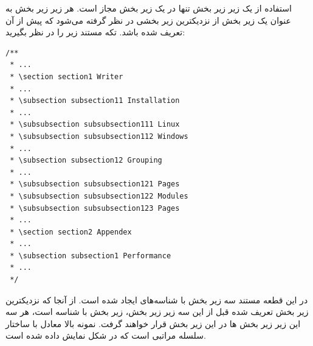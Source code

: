 استفاده از یک زیر زیر بخش تنها در یک زیر بخش مجاز است. هر زیر زیر بخش به عنوان
یک زیر بخش از نزدیکترین زیر بخشی در نظر گرفته می‌شود که پیش از آن تعریف شده
باشد. تکه مستند زیر را در نظر بگیرید:

\begin{latin}
\lstset{language=C++}  
\begin{lstlisting}[frame=single] 
/**
 * ...
 * \section section1 Writer
 * ...
 * \subsection subsection11 Installation
 * ...
 * \subsubsection subsubsection111 Linux
 * \subsubsection subsubsection112 Windows
 * ...
 * \subsection subsection12 Grouping
 * ...
 * \subsubsection subsubsection121 Pages
 * \subsubsection subsubsection122 Modules
 * \subsubsection subsubsection123 Pages
 * ...
 * \section section2 Appendex
 * ...
 * \subsection subsection1 Performance
 * ...
 */
\end{lstlisting}
\end{latin}

در این قطعه مستند سه زیر بخش با شناسه‌های  ایجاد شده است.
از آنجا که نزدیکترین زیر بخش تعریف شده قبل از این سه زیر زیر بخش، زیر بخش با
شناسه  است، هر سه این زیر زیر بخش ها در این زیر بخش قرار خواهند
گرفت. نمونه بالا معادل با ساختار سلسله مراتبی است که در شکل
\label{write-grouping-pages-section-tree} نمایش داده شده است.
 
